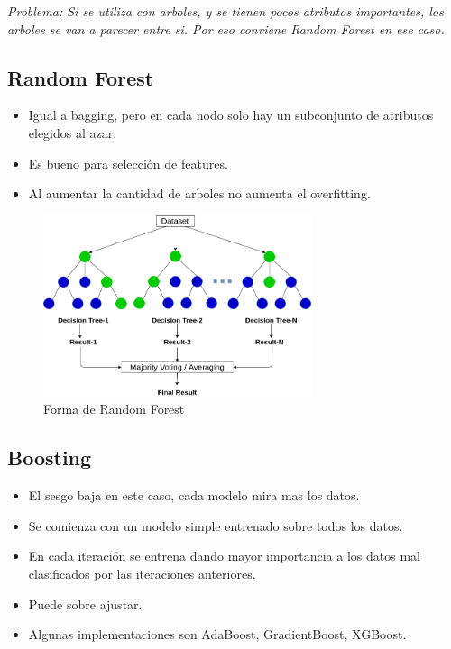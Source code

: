 \documentclass[titlepage,a4paper]{article}
\begin{document}
\textit{Problema: Si se utiliza con arboles, y se tienen pocos atributos importantes, los arboles se van a parecer entre si. Por eso conviene Random Forest en ese caso.}

\subsection{Random Forest}

\begin{itemize}
    \item Igual a bagging, pero en cada nodo solo hay un subconjunto de atributos elegidos al azar.
    \item Es bueno para selección de features.
    \item Al aumentar la cantidad de arboles no aumenta el overfitting.
\end{itemize}

\begin{figure}[!htb]
    \centering
    \includegraphics[width=0.7\textwidth]{imagenesResumen/RandomForest.png}
    \caption{Forma de Random Forest}
\end{figure}


\subsection{Boosting}
\begin{itemize}
    \item El sesgo baja en este caso, cada modelo mira mas los datos.
    \item Se comienza con un modelo simple entrenado sobre todos los datos.
    \item En cada iteración se entrena dando mayor importancia a los datos mal clasificados por las iteraciones anteriores.
    \item Puede sobre ajustar.
    \item Algunas implementaciones son AdaBoost, GradientBoost, XGBoost.
\end{itemize}
\end{document}
